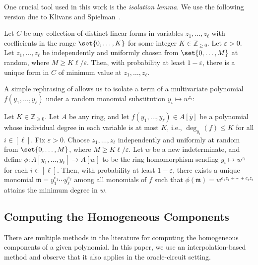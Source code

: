 \documentclass[10pt,a4paper]{amsart}
\newcommand*\ie{i.e.}
\newcommand*\Z{\mathbb{Z}}
\newcommand*\e{\varepsilon}
\begin{document}
One crucial tool used in this work is the \emph{isolation lemma}.
We use the following version due to Klivans and Spielman~\cite{KS01}.

\begin{lem}[{\cite[Lemma 4]{KS01}}]\label{lem:isolation_forms}
    Let $C$ be any collection of distinct linear forms in variables $z_1, \ldots, z_\ell$ with coefficients in the range $\set{0, \ldots, K}$ for some integer $K \in \Z_{\geq 0}$.
    Let $\e > 0$.
    Let $z_1, \ldots, z_\ell$ be independently and uniformly chosen from $\set{0, \ldots, M}$ at random, where $M\geq K \ell / \e$.
    Then, with probability at least $1 - \e$, there is a unique form in $C$ of minimum value at $z_1, \ldots, z_\ell$.
\end{lem}

A simple rephrasing of  allows us to isolate a term of a multivariate polynomial $f(y_1,\dots,y_\ell)$ under a random monomial substitution $y_i\mapsto w^{z_i}$:
\begin{cor}\label{cor:isolation_exponents}
    Let $K \in \Z_{\geq 0}$.  
    Let $A$ be any ring, and let $f(y_1, \ldots, y_\ell) \in A[\overline{y}]$ be a polynomial whose individual degree in each variable is at most $K$, \ie, $\deg_{y_i}(f) \leq K$ for all $i \in [\ell]$.  
    Fix $\e > 0$.  
    Choose $z_1, \ldots, z_\ell$ independently and uniformly at random from $\set{0, \ldots, M}$, where $M \geq K\ell/\e$.  
    Let $w$ be a new indeterminate, and define $\phi \colon A[y_1, \ldots, y_\ell] \to A[w]$ to be the ring homomorphism sending $y_i \mapsto w^{z_i}$ for each $i \in [\ell]$.  
    Then, with probability at least $1 - \e$, there exists a unique monomial $\mathfrak{m} = y_1^{e_1}\cdots y_\ell^{e_\ell}$ among all monomials of $f$ such that  $\phi(\mathfrak{m}) = w^{e_1 z_1 + \cdots + e_\ell z_\ell}$
    attains the minimum degree in $w$.
\end{cor}

\subsection{Computing the Homogeneous Components}

There are multiple methods in the literature for computing the homogeneous components of a given polynomial.
In this paper, we use an interpolation-based method and observe that it also applies in the oracle-circuit setting.
\end{document}
